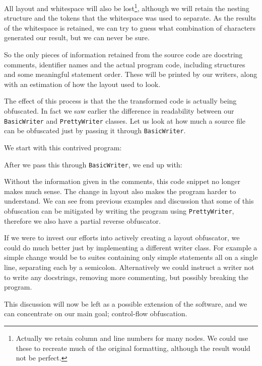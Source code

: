 \documentclass{report}
\begin{document}
All layout and whitespace will also be lost\footnote{Actually we retain column and line numbers for many nodes. We could
use these to recreate much of the original formatting, although the result would not be perfect.}, although we will retain the nesting structure and the tokens that the
whitespace was used to separate. As the results of the whitespace is retained, we can try to guess what combination
of characters generated our result, but we can never be sure.

So the only pieces of information retained from the source code are docstring comments, identifier names and the actual
program code, including structures and some meaningful statement order. These will be printed by our writers, along with
an estimation of how the layout used to look.

The effect of this process is that the the transformed code is actually being obfuscated. In fact we saw earlier the difference
in readability between our \texttt{BasicWriter} and \texttt{PrettyWriter} classes. Let us look at how much a source file
can be obfuscated just by passing it through \texttt{BasicWriter}.

We start with this contrived program:



After we pass this through \texttt{BasicWriter}, we end up with:



Without the information given in the comments, this code snippet no longer makes much sense. The change in layout also
makes the program harder to understand. We can see from previous examples and discussion that some of this obfuscation
can be mitigated by writing the program using \texttt{PrettyWriter}, therefore we also have a partial reverse obfuscator.

If we were to invest our efforts into actively creating a layout obfuscator, we could do much better just by implementing
a different writer class. For example a simple change would be to suites containing only simple statements all on a single
line, separating each by a semicolon. Alternatively we could instruct a writer not to write any docstrings, removing more
commenting, but possibly breaking the program.

This discussion will now be left as a possible extension of the software, and we can concentrate on our main goal;
control-flow obfuscation.
\end{document}
